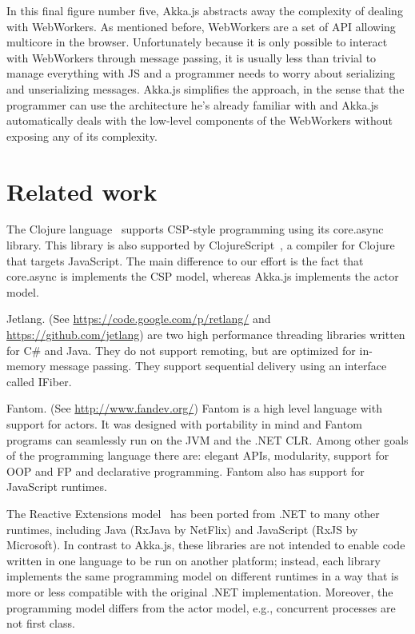 \documentclass{sig-alternate}
\begin{document}
In this final figure number five, Akka.js abstracts away the complexity of dealing with WebWorkers. As mentioned before, WebWorkers
are a set of API allowing multicore in the browser. Unfortunately because it is only possible to interact with WebWorkers 
through message passing, it is usually less than trivial to manage everything with JS and a programmer needs to worry
about serializing and unserializing messages. Akka.js simplifies the approach, in the sense that the programmer can use
the architecture he's already familiar with and Akka.js automatically deals with the low-level components of the WebWorkers
without exposing any of its complexity.


\section{Related work}\label{sec:related}

The Clojure language~\cite{Halloway09} supports CSP-style programming using its
core.async library. This library is also supported by
ClojureScript~\cite{ClojureScript}, a compiler for Clojure that targets
JavaScript. The main difference to our effort is the fact that core.async is
implements the CSP model, whereas Akka.js implements the actor model.

Jetlang. (See \url{https://code.google.com/p/retlang/} and \url{https://github.com/jetlang}) are two high performance threading libraries written for C\# and Java. They do not support remoting, but are optimized for in-memory message passing. They support sequential delivery using an interface called IFiber.

Fantom. (See \url{http://www.fandev.org/}) Fantom is a high level language with support for actors. It was designed with portability in mind and Fantom programs can seamlessly run on the JVM and the .NET CLR. Among other goals of the programming language there are: elegant APIs, modularity, support for OOP and FP and declarative programming. Fantom also has support for JavaScript runtimes.

The Reactive Extensions model~\cite{Meijer12} has been ported from .NET to
many other runtimes, including Java (RxJava by NetFlix) and JavaScript (RxJS
by Microsoft). In contrast to Akka.js, these libraries are not intended to
enable code written in one language to be run on another platform; instead,
each library implements the same programming model on different runtimes in a
way that is more or less compatible with the original .NET implementation.
Moreover, the programming model differs from the actor model, e.g., concurrent
processes are not first class.
\end{document}

